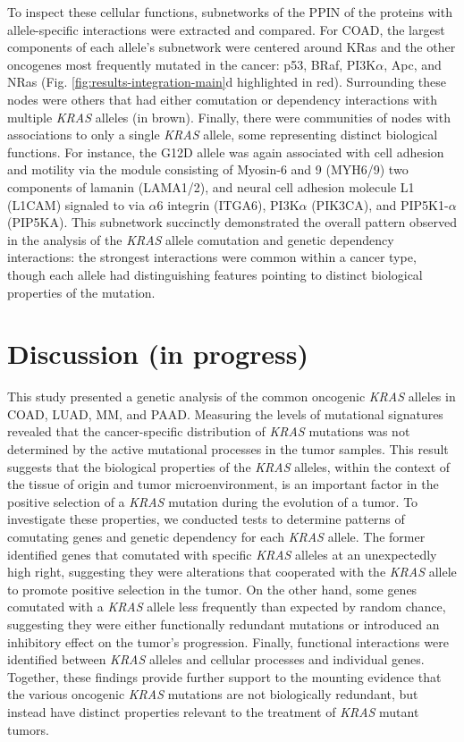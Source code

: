 \documentclass[english, 10pt, letterpaper]{article}
\newcommand{\KRAS}{\emph{KRAS}}
\newcommand{\kras}{KRas}
\begin{document}
To inspect these cellular functions, subnetworks of the PPIN of the proteins with allele-specific interactions were extracted and compared.
For COAD, the largest components of each allele's subnetwork were centered around \kras{} and the other oncogenes most frequently mutated in the cancer: p53, BRaf, PI3K$\alpha$, Apc, and NRas (Fig. \ref{fig:results-integration-main}d highlighted in red).
Surrounding these nodes were others that had either comutation or dependency interactions with multiple \KRAS{} alleles (in brown).
Finally, there were communities of nodes with associations to only a single \KRAS{} allele, some representing distinct biological functions.
For instance, the G12D allele was again associated with cell adhesion and motility via the module consisting of Myosin-6 and 9 (MYH6/9) two components of lamanin (LAMA1/2), and neural cell adhesion molecule L1 (L1CAM) signaled to via $\alpha$6 integrin (ITGA6), PI3K$\alpha$ (PIK3CA), and PIP5K1-$\alpha$ (PIP5KA).
This subnetwork succinctly demonstrated the overall pattern observed in the analysis of the \KRAS{} allele comutation and genetic dependency interactions: the strongest interactions were common within a cancer type, though each allele had distinguishing features pointing to distinct biological properties of the mutation.



\section*{Discussion (in progress)}

This study presented a genetic analysis of the common oncogenic \KRAS{} alleles in COAD, LUAD, MM, and PAAD.
Measuring the levels of mutational signatures revealed that the cancer-specific distribution of \KRAS{} mutations was not determined by the active mutational processes in the tumor samples.
This result suggests that the biological properties of the \KRAS{} alleles, within the context of the tissue of origin and tumor microenvironment, is an important factor in the positive selection of a \KRAS{} mutation during the evolution of a tumor.
To investigate these properties, we conducted tests to determine patterns of comutating genes and genetic dependency for each \KRAS{} allele.
The former identified genes that comutated with specific \KRAS{} alleles at an unexpectedly high right, suggesting they were alterations that cooperated with the \KRAS{} allele to promote positive selection in the tumor.
On the other hand, some genes comutated with a \KRAS{} allele less frequently than expected by random chance, suggesting they were either functionally redundant mutations or introduced an inhibitory effect on the tumor's progression.
Finally, functional interactions were identified between \KRAS{} alleles and cellular processes and individual genes.
Together, these findings provide further support to the mounting evidence that the various oncogenic \KRAS{} mutations are not biologically redundant, but instead have distinct properties relevant to the treatment of \KRAS{} mutant tumors.
\end{document}
